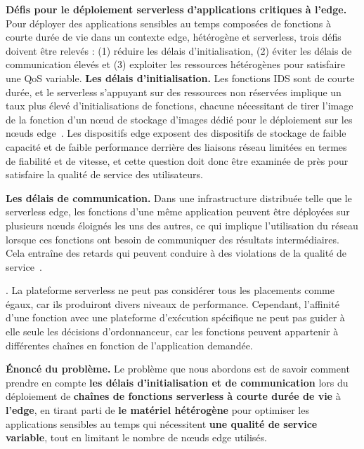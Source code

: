 \textbf{Défis pour le déploiement serverless d'applications critiques à l'edge.} Pour déployer des applications sensibles au temps composées de fonctions à courte durée de vie dans un contexte edge, hétérogène et serverless, trois défis doivent être relevés : (1) réduire les délais d'initialisation, (2) éviter les délais de communication élevés et (3) exploiter les ressources hétérogènes pour satisfaire une QoS variable.
\textbf{Les délais d'initialisation.} Les fonctions IDS sont de courte durée, et le serverless s'appuyant sur des ressources non réservées implique un taux plus élevé d'initialisations de fonctions, chacune nécessitant de tirer l'image de la fonction d'un nœud de stockage d'images dédié pour le déploiement sur les nœuds edge~\cite{yanHermesEfficientCache2020}. Les dispositifs edge exposent des dispositifs de stockage de faible capacité et de faible performance derrière des liaisons réseau limitées en termes de fiabilité et de vitesse, et cette question doit donc être examinée de près pour satisfaire la qualité de service des utilisateurs.

\textbf{Les délais de communication.} Dans une infrastructure distribuée telle que le serverless edge, les fonctions d'une même application peuvent être déployées sur plusieurs nœuds éloignés les uns des autres, ce qui implique l'utilisation du réseau lorsque ces fonctions ont besoin de communiquer des résultats intermédiaires. Cela entraîne des retards qui peuvent conduire à des violations de la qualité de service~\cite{wawrzoniakBoxerDataAnalytics2021a}.

\cite{wawrzoniakBoxerDataAnalytics2021a}. La plateforme serverless ne peut pas considérer tous les placements comme égaux, car ils produiront divers niveaux de performance. Cependant, l'affinité d'une fonction avec une plateforme d'exécution spécifique ne peut pas guider à elle seule les décisions d'ordonnanceur, car les fonctions peuvent appartenir à différentes chaînes en fonction de l'application demandée.

\textbf{Énoncé du problème.} Le problème que nous abordons est de savoir comment prendre en compte \textbf{les délais d'initialisation et de communication} lors du déploiement de \textbf{chaînes de fonctions serverless à courte durée de vie} à \textbf{l'edge}, en tirant parti de \textbf{le matériel hétérogène} pour optimiser les applications sensibles au temps qui nécessitent \textbf{une qualité de service variable}, tout en limitant le nombre de nœuds edge utilisés.

